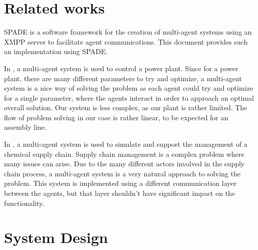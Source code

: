 \documentclass[conference]{IEEEtran}
\begin{document}
\section{Related works}

SPADE \cite{SPADE} is a software framework for the creation of multi-agent systems using an XMPP server to facilitate agent communications. This document provides such an implementation using SPADE. 

In \cite{powerplant}, a multi-agent system is used to control a power plant. Since for a power plant, there are many different parameters to try and optimize, a multi-agent system is a nice way of solving the problem as each agent could try and optimize for a single parameter, where the agents interact in order to approach an optimal overall solution. Our system is less complex, as our plant is rather limited. The flow of problem solving in our case is rather linear, to be expected for an assembly line. 

In \cite{Chemical}, a multi-agent system is used to simulate and support the management of a chemical supply chain. Supply chain management is a complex problem where many issues can arise. Due to the many different actors involved in the supply chain process, a multi-agent system is a very natural approach to solving the problem. This system is implemented using a different communication layer between the agents, but that layer shouldn't have significant impact on the functionality. 


\section{System Design}
\end{document}
